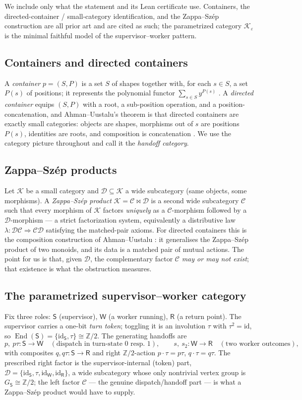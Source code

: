 \documentclass[11pt]{amsart}
\theoremstyle{definition}
\theoremstyle{remark}
\newcommand{\End}{\operatorname{End}}
\newcommand{\id}{\mathrm{id}}
\newcommand{\C}{\mathcal{C}}
\newcommand{\D}{\mathcal{D}}
\newcommand{\K}{\mathcal{K}}
\newcommand{\Sup}{\mathsf{S}}
\newcommand{\Wk}{\mathsf{W}}
\newcommand{\Rt}{\mathsf{R}}
\begin{document}
We include only what the statement and its Lean certificate use. Containers, the directed-container /
small-category identification, and the Zappa--Sz\'ep construction are all prior art and are cited as
such; the parametrized category $\K_\varepsilon$ is the minimal faithful model of the
supervisor--worker pattern.

\subsection*{Containers and directed containers}
A \emph{container} $p=(S,P)$ is a set $S$ of shapes together with, for each $s\in S$, a set $P(s)$ of
positions; it represents the polynomial functor $\sum_{s\in S}y^{P(s)}$ \cite{NiuSpivak,SpivakRef}. A
\emph{directed container} equips $(S,P)$ with a root, a sub-position operation, and a
position-concatenation, and Ahman--Uustalu's theorem is that directed containers are exactly small
categories: objects are shapes, morphisms out of $s$ are positions $P(s)$, identities are roots, and
composition is concatenation \cite{AhmanUustalu}. We use the category picture throughout and call it
the \emph{handoff category}.

\subsection*{Zappa--Sz\'ep products}
Let $\K$ be a small category and $\D\subseteq\K$ a wide subcategory (same objects, some morphisms). A
\emph{Zappa--Sz\'ep product} $\K=\C\bowtie\D$ is a second wide subcategory $\C$ such that every
morphism of $\K$ factors \emph{uniquely} as a $\C$-morphism followed by a $\D$-morphism --- a strict
factorization system, equivalently a distributive law $\lambda:\D\C\Rightarrow\C\D$ satisfying the
matched-pair axioms. For directed containers this is the composition construction of Ahman--Uustalu
\cite{AhmanUustaluDL}: it generalises the Zappa--Sz\'ep product of two monoids, and its data is a
matched pair of mutual actions. The point for us is that, given $\D$, the complementary factor $\C$
\emph{may or may not exist}; that existence is what the obstruction measures.

\subsection*{The parametrized supervisor--worker category}
Fix three roles: $\Sup$ (supervisor), $\Wk$ (a worker running), $\Rt$ (a return point). The supervisor
carries a one-bit \emph{turn token}; toggling it is an involution $\tau$ with $\tau^2=\id$, so
$\End(\Sup)=\{\id_\Sup,\tau\}\cong\mathbb Z/2$. The generating handoffs are
\[
  p,\ p\tau:\Sup\to\Wk\quad(\text{dispatch in turn-state $0$ resp.\ $1$}),
  \qquad
  s,\ s_2:\Wk\to\Rt\quad(\text{two worker outcomes}),
\]
with composites $q,q\tau:\Sup\to\Rt$ and right $\mathbb Z/2$-action $p\cdot\tau=p\tau$,
$q\cdot\tau=q\tau$. The prescribed right factor is the supervisor-internal (token) part,
$\D=\{\id_\Sup,\tau,\id_\Wk,\id_\Rt\}$, a wide subcategory whose only nontrivial vertex group is
$G_\Sup\cong\mathbb Z/2$; the left factor $\C$ --- the genuine dispatch/handoff part --- is what a
Zappa--Sz\'ep product would have to supply.
\end{document}
